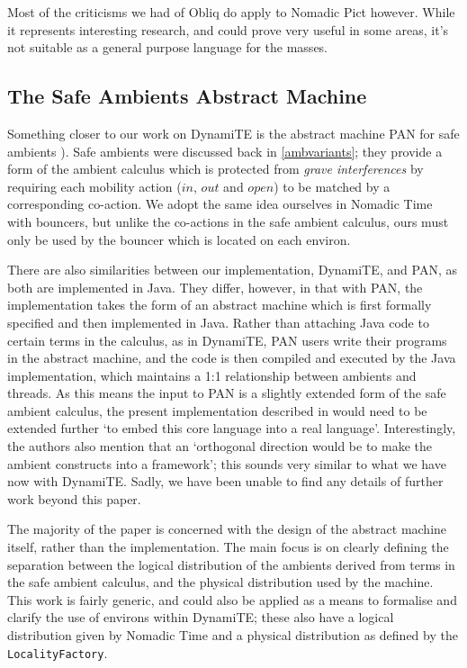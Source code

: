 Most of the criticisms we had of Obliq do apply to Nomadic Pict
however.  While it represents interesting research, and could prove
very useful in some areas, it's not suitable as a general purpose
language for the masses.

\subsection{The Safe Ambients Abstract Machine}

Something closer to our work on DynamiTE is the abstract machine PAN
for safe ambients \cite{sangiorgi:safeambientsmachine}).  Safe
ambients were discussed back in \ref{ambvariants}; they provide a form
of the ambient calculus which is protected from \emph{grave
  interferences} by requiring each mobility action ($in$, $out$ and
$open$) to be matched by a corresponding co-action.  We adopt the same
idea ourselves in Nomadic Time with bouncers, but unlike the
co-actions in the safe ambient calculus, ours must only be used by the
bouncer which is located on each environ.

There are also similarities between our implementation, DynamiTE, and
PAN, as both are implemented in Java.  They differ, however, in that
with PAN, the implementation takes the form of an abstract machine
which is first formally specified and then implemented in Java.
Rather than attaching Java code to certain terms in the calculus, as
in DynamiTE, PAN users write their programs in the abstract machine,
and the code is then compiled and executed by the Java implementation,
which maintains a 1:1 relationship between ambients and threads.  As
this means the input to PAN is a slightly extended form of the safe
ambient calculus, the present implementation described in
\cite{sangiorgi:safeambientsmachine} would need to be extended further
`to embed this core language into a real language'.  Interestingly,
the authors also mention that an `orthogonal direction would be to
make the ambient constructs into a framework'; this sounds very
similar to what we have now with DynamiTE.  Sadly, we have been unable
to find any details of further work beyond this paper.

The majority of the paper is concerned with the design of the abstract
machine itself, rather than the implementation.  The main focus is on
clearly defining the separation between the logical distribution of
the ambients derived from terms in the safe ambient calculus, and the
physical distribution used by the machine.  This work is fairly
generic, and could also be applied as a means to formalise and clarify
the use of environs within DynamiTE; these also have a logical
distribution given by Nomadic Time and a physical distribution as
defined by the \texttt{LocalityFactory}.

